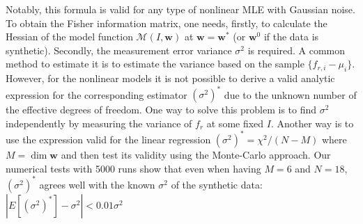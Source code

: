 \documentclass[%
 aip,
 amsmath,amssymb,
 reprint,%
]{revtex4-1}
\begin{document}
Notably, this formula is valid for any type of nonlinear MLE with Gaussian noise. To obtain the Fisher information matrix, one needs, firstly, to calculate the Hessian of the model function $\mathcal{M}(I, \mathbf{w})$ at $\mathbf{w}=\mathbf{w}^*$ (or $ \mathbf{w}^0 $ if the data is synthetic). Secondly, the measurement error variance $\sigma^2$ is required. A common method to estimate it is to estimate the variance based on the sample $\{f_{r,i} - \mu_i\}$. However, for the nonlinear models it is not possible\cite{ye1998, andrae2010} to derive a valid analytic expression for the corresponding estimator $(\sigma^2)^*$ due to the unknown number of the effective degrees of freedom. One way to solve this problem is to find $\sigma^2$ independently by measuring the variance of $f_r$ at some fixed $I$. Another way is to use the expression valid for the linear regression
$(\sigma^{2})^* = \chi^2/(N-M)$ where $M = \dim \mathbf{w}$ and then test its validity using the Monte-Carlo approach. Our numerical tests with 5000 runs show that even when having $M=6$ and $N=18$, $(\sigma^{2})^*$ agrees well with the known $\sigma^2$ of the synthetic data:  $|E[(\sigma^{2})^*] - \sigma^2|< 0.01 \sigma^2$
\end{document}
